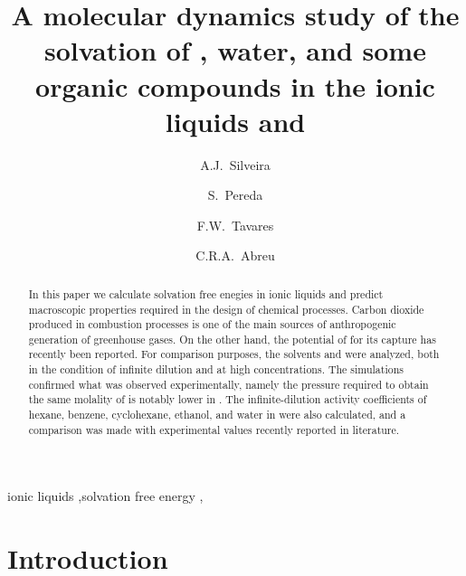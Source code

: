 \documentclass[3p,twocolumn]{elsarticle}
\begin{document}
\begin{frontmatter}

\title{A molecular dynamics study of the solvation of , water, and some organic compounds in the ionic liquids \ce{[emim][B(CN)_4]} and \ce{[emim][NTf_2]}}

\author[rvt]{A.J.~Silveira}
\author[rvt]{S.~Pereda}
\author[focal,els]{F.W.~Tavares}
\author[focal]{C.R.A.~Abreu}

\address[rvt]{Planta Piloto de Ingenier\'ia Qu\'imica, PLAPIQUI, Universidad Nacional del Sur,Camino La Carrindanga Km 7-CC: 717, Bah\'ia Blanca, Argentina}
\address[focal]{Chemical Engineering Department, Escola de Qu\'imica, Universidade Federal do Rio de Janeiro,Rio de Janeiro, RJ 21941-909, Brazil}
\address[els]{COPPE, Universidade Federal do Rio de Janeiro, Rio de Janeiro, RJ 21941-909, Brazil}


\begin{abstract}
In this paper we calculate solvation free enegies in ionic liquids and predict macroscopic properties required in the design of chemical processes. Carbon dioxide produced in combustion processes is one of the main sources of anthropogenic generation of greenhouse gases. On the other hand, the potential of \ce{[emim][B(CN)_4]} for its capture has recently been reported. For comparison purposes, the solvents \ce{[emim][B(CN)_4]} and \ce{[emim][NTf_2]} were analyzed, both in the condition of infinite dilution and at high concentrations. The simulations confirmed what was observed experimentally, namely the pressure required to obtain the same molality of  is notably lower in \ce{[emim][B(CN)_4]}. The infinite-dilution activity coefficients of hexane, benzene, cyclohexane, ethanol, and water in \ce{[emim][B(CN)_4]} were also calculated, and a comparison was made with experimental values recently reported in literature.
\end{abstract}

\begin{keyword}
ionic liquids \sep solvation free energy \sep  {} 
\end{keyword}

\end{frontmatter}

\linenumbers

\section{Introduction}
\end{document}
